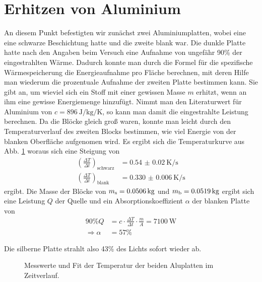 \documentclass[12pt,a4paper,titlepage,headinclude,bibtotoc]{scrartcl}
\begin{document}
\section{Erhitzen von Aluminium}
An diesem Punkt befestigten wir zunächst zwei Aluminiumplatten, wobei eine eine schwarze Beschichtung hatte und die zweite blank war.
Die dunkle Platte hatte nach den Angaben beim Versuch eine Aufnahme von ungefähr 90\% der eingestrahlten Wärme.
Dadurch konnte man durch die Formel für die spezifische Wärmespeicherung die Energieaufnahme pro Fläche berechnen, mit deren Hilfe man wiederum die prozentuale Aufnahme der zweiten Platte bestimmen kann.
Sie gibt an, um wieviel sich ein Stoff mit einer gewissen Masse $m$ erhitzt, wenn an ihm eine gewisse Energiemenge hinzufügt.
Nimmt man den Literaturwert für Aluminium von $c=\SI{896}{\joule\per\kilo\gram\per\kelvin}$, so kann man damit die eingestrahlte Leistung berechnen.
Da die Blöcke gleich groß waren, konnte man leicht durch den Temperaturverlauf des zweiten Blocks bestimmen, wie viel Energie von der blanken Oberfläche aufgenomen wird.
Es ergibt sich die Temperaturkurve aus Abb. \ref{fig:aluSW} woraus sich eine Steigung von
\begin{align*}
	\left( \frac{\Delta T}{\Delta t} \right)_\text{schwarz}&=\SI{0.54(2)}{\kelvin \per \second}\\
	\left( \frac{\Delta T}{\Delta t} \right)_\text{blank}&=\SI{0.330(6)}{\kelvin \per \second}
\end{align*}
ergibt.
Die Masse der Blöcke von $m_\text s= \SI{0.0506}{\kilo\gram}$ und $m_\text b = \SI{0.0519}{\kilo\gram}$ ergibt sich eine Leistung $Q$ der Quelle und ein Absorptionskoeffizient $\alpha$ der blanken Platte von
\begin{align*}
	90\% Q &= c\cdot  \frac{\Delta T}{\Delta t}\cdot \frac{m}{A} = \SI{7100}{\watt}\\
	\Rightarrow \alpha &= 57\%
\end{align*}

Die silberne Platte strahlt also 43\% des Lichts sofort wieder ab.

\begin{figure}[h]
	\centering
	
	\caption{Messwerte und Fit der Temperatur der beiden Aluplatten im Zeitverlauf.}
	\label{fig:aluSW}
\end{figure}
\end{document}

